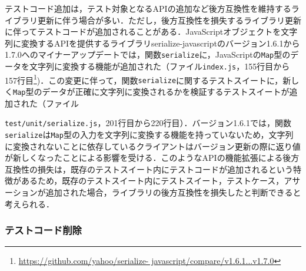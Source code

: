 \documentclass[submit]{ipsj}
\begin{document}
テストコード追加は，テスト対象となるAPIの追加など後方互換性を維持するライブラリ更新に伴う場合が多い．ただし，後方互換性を損失するライブラリ更新に伴ってテストコードが追加されることがある．JavaScriptオブジェクトを文字列に変換するAPIを提供するライブラリserialize-javascriptのバージョン1.6.1から1.7.0へのマイナーアップデートでは，関数{\verb|serialize|}に，JavaScriptの{\verb|Map|}型のデータを文字列に変換する機能が追加された（ファイル{\verb|index.js|}，155行目から157行目\footnote{\url{https://github.com/yahoo/serialize- javascript/compare/v1.6.1...v1.7.0}})．この変更に伴って，関数{\verb|serialize|}に関するテストスイートに，新しく{\verb|Map|}型のデータが正確に文字列に変換されるかを検証するテストスイートが追加された（ファイル{\verb|test/unit/serialize.js|，201行目から220行目\footnotemark[13]）．バージョン1.6.1では，関数{\verb|serialize|}は{\verb|Map|}型の入力を文字列に変換する機能を持っていないため，文字列に変換されないことに依存しているクライアントはバージョン更新の際に返り値が新しくなったことによる影響を受ける．このようなAPIの機能拡張による後方互換性の損失は，既存のテストスイート内にテストコードが追加されるという特徴があるため，既存のテストスイート内にテストスイート，テストケース，アサーションが追加された場合，ライブラリの後方互換性を損失したと判断できると考えられる．

\subsubsection{テストコード削除}\label{subsec:delete-test}



}
\end{document}
